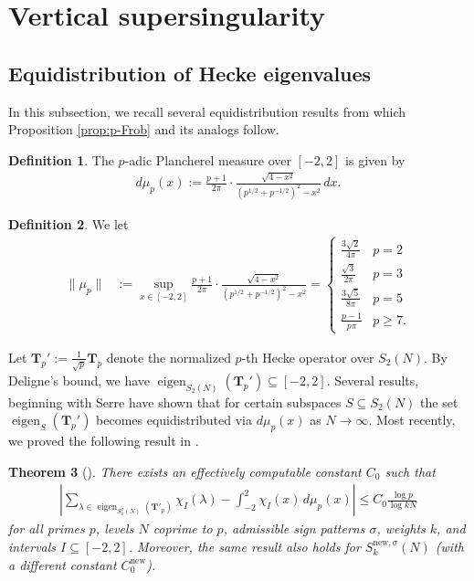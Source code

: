 \documentclass[11pt,letterpaper,reqno]{amsart}
\newtheorem{theorem}{Theorem}[section]
\theoremstyle{definition}
\newtheorem{definition}[theorem]{Definition}
\numberwithin{equation}{section}
\numberwithin{figure}{section}
\numberwithin{table}{section}
\let\subsectiontemp\subsection
\renewcommand{\subsection}[1]{ 
    \subsectiontemp{#1} \hfill\vspace{0.5\linespacing} 
}
\newcommand{\nw}{\mathrm{new}}
\newcommand{\eigen}{\operatorname{eigen}}
\begin{document}
\section{Vertical supersingularity}\label{section:vertical}

\subsection{Equidistribution of Hecke eigenvalues}\label{subsection:equidistribution-survey}

In this subsection, we recall several equidistribution results from which Proposition \ref{prop:p-Frob} and its analogs follow.

\begin{definition}
    The $p$-adic Plancherel measure over $[-2, 2]$ is given by
    \begin{align}
        d\mu_p(x) := \frac{p + 1}{2\pi} \cdot \frac{\sqrt{4 - x^2}}{\left( p^{1/2} + p^{-1/2}  \right)^2 -  x^2} \,dx. \label{eqn:definition-of-Plancherel}
    \end{align}
\end{definition}

\begin{definition} \label{def:mu-p}
    We let
    \begin{align}
        \| \mu_p\| &:= \sup_{x \in [-2, 2]} \frac{p + 1}{2\pi} \cdot \frac{\sqrt{4 - x^2}}{\left( p^{1/2} + p^{-1/2}  \right)^2 -  x^2} = \begin{cases}
        \frac{3\sqrt{2}}{4\pi} & p = 2\\
        \frac{\sqrt{3}}{2\pi} & p = 3\\
        \frac{3\sqrt{5}}{8\pi} & p = 5\\
        \frac{p - 1}{p\pi} & p \geq 7.
    \end{cases}
    \end{align}
\end{definition}

Let $\mathbf{T}_p' := \frac{1}{\sqrt{p}} \mathbf{T}_p$ denote the normalized $p$-th Hecke operator over $S_2(N)$. By Deligne's bound, we have $\eigen_{S_2(N)}(\mathbf{T}_p') \subseteq [-2, 2].$ Several results, beginning with Serre \cite[Th\'eor\`eme 1]{ser97} have shown that for certain subspaces $S \subseteq S_2(N)$ the set $\eigen_{S}(\mathbf{T}_p')$ becomes equidistributed via $d\mu_p(x)$ as $N \rightarrow \infty.$ Most recently, we proved the following result in \cite[Theorem 1.1]{KMRX}.

\begin{theorem}[{\cite[Theorem 1.1]{KMRX}}]
There exists an effectively computable constant $C_0$ such that 
    \begin{align}
        \left| \sum_{\lambda \in \operatorname{eigen}_{S_k^{\sigma}(N)}(\mathbf{T}'_p)} \chi_I(\lambda) - \int_{-2}^2 \chi_I(x) \, d \mu_p(x)  \right| \le C_0  \frac{\log p}{\log kN} \label{eqn:KMRX-thm-1.1}
    \end{align}
    for all primes $p$, levels $N$ coprime to $p$, admissible sign patterns $\sigma$, weights $k$, and intervals $I \subseteq [-2,2]$. Moreover, the same result also holds for $S_k^{\nw,\sigma}(N)$ (with a different constant $C_0^\nw$).
\end{theorem}
\end{document}
